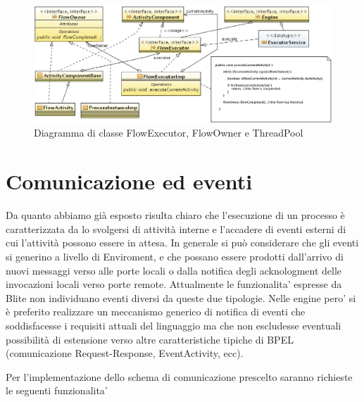 \begin{figure}[p]
\begin{center}
\includegraphics[angle=90,scale=0.75]
{architettura_interna/dia/flowClassDiagram}
\caption[Diagramma di classe FlowExecutor \ldots] {
   	\textsf{{\small Diagramma di classe FlowExecutor, FlowOwner e ThreadPool}} }
  \label{fig:flowclass}
\end{center}
\end{figure}

\section{Comunicazione ed eventi}
Da quanto abbiamo già esposto risulta chiaro che l'esecuzione di un processo \`e
caratterizzata da lo svolgersi di attività interne e l'accadere di eventi
esterni di cui l'attività possono essere in attesa. In generale si può
considerare che gli eventi si generino a livello di Enviroment, e che possano
essere prodotti dall'arrivo di nuovi messaggi verso alle porte locali o
dalla notifica degli acknologment delle invocazioni locali
verso porte remote. Attualmente le funzionalita' espresse da Blite non
individuano eventi diversi da queste due tipologie. Nelle engine pero' si \`e
preferito realizzare un meccanismo generico di notifica di eventi che
soddisfacesse i requisiti attuali del linguaggio ma che non escludesse eventuali
possibilità di estensione verso altre caratteristiche tipiche di BPEL
(comunicazione Request-Response, EventActivity, ecc).

Per l'implementazione dello schema di comunicazione prescelto saranno richieste
le seguenti funzionalita'

